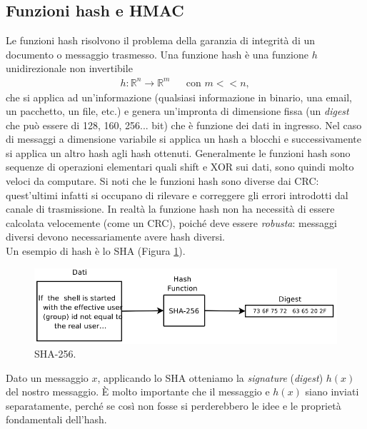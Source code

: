 \subsection{Funzioni hash e HMAC}
Le funzioni hash risolvono il problema della garanzia di integrità di un documento o messaggio trasmesso. Una funzione hash è una funzione $h$ unidirezionale non invertibile
\begin{eqnarray*}
h:\mathbb{R}^n\to\mathbb{R}^m & & \text{con } m << n\text{,}\
\end{eqnarray*}
che si applica ad un'informazione (qualsiasi informazione in binario, una email, un pacchetto, un file, etc.) e genera un'impronta di dimensione fissa (un \textit{digest} che può essere di 128, 160, 256... bit) che è funzione dei dati in ingresso. Nel caso di messaggi a dimensione variabile si applica un hash a blocchi e successivamente si applica un altro hash agli hash ottenuti. Generalmente le funzioni hash sono sequenze di operazioni elementari quali shift e XOR sui dati, sono quindi molto veloci da computare. Si noti che le funzioni hash sono diverse dai CRC: quest'ultimi infatti si occupano di rilevare e correggere gli errori introdotti dal canale di trasmissione. In realtà la funzione hash non ha necessità di essere calcolata velocemente (come un CRC), poiché deve essere \textit{robusta}: messaggi diversi devono necessariamente avere hash diversi. \\
Un esempio di hash è lo SHA (Figura \ref{img:SHA}).
\begin{figure}[htbp]
	\centering
	\includegraphics[scale = 0.5]{images/SHA}
	\caption{SHA-256.}
	\label{img:SHA}
\end{figure}
Dato un messaggio $x$, applicando lo SHA otteniamo la \textit{signature} (\textit{digest}) $h(x)$ del nostro messaggio. È molto importante che il messaggio e $h(x)$ siano inviati separatamente, perché se così non fosse si perderebbero le idee e le proprietà fondamentali dell'hash.
